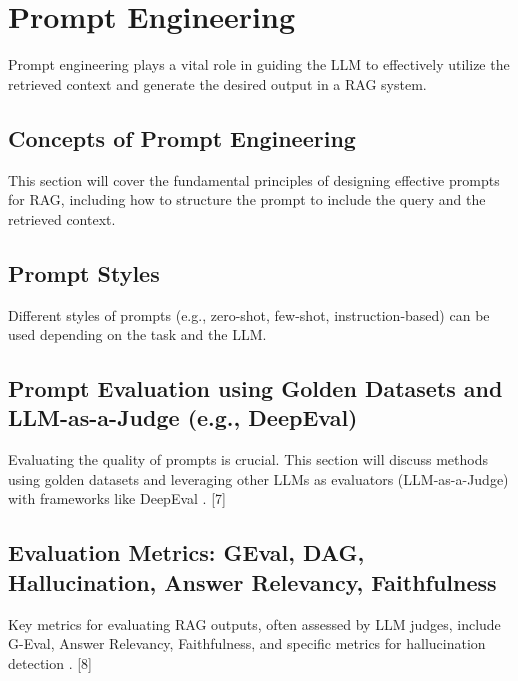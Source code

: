 \chapter{Prompt Engineering}
\label{chap:prompt_engineering}

Prompt engineering plays a vital role in guiding the LLM to effectively utilize the retrieved context and generate the desired output in a RAG system.

\section{Concepts of Prompt Engineering}
This section will cover the fundamental principles of designing effective prompts for RAG, including how to structure the prompt to include the query and the retrieved context.

\section{Prompt Styles}
Different styles of prompts (e.g., zero-shot, few-shot, instruction-based) can be used depending on the task and the LLM.

\section{Prompt Evaluation using Golden Datasets and LLM-as-a-Judge (e.g., DeepEval)}
Evaluating the quality of prompts is crucial. This section will discuss methods using golden datasets and leveraging other LLMs as evaluators (LLM-as-a-Judge) with frameworks like DeepEval \autocite{rag_eval_qdrant_2024}. [7]

\section{Evaluation Metrics: GEval, DAG, Hallucination, Answer Relevancy, Faithfulness}
Key metrics for evaluating RAG outputs, often assessed by LLM judges, include G-Eval, Answer Relevancy, Faithfulness, and specific metrics for hallucination detection \autocite{rag_eval_pinecone}. [8]